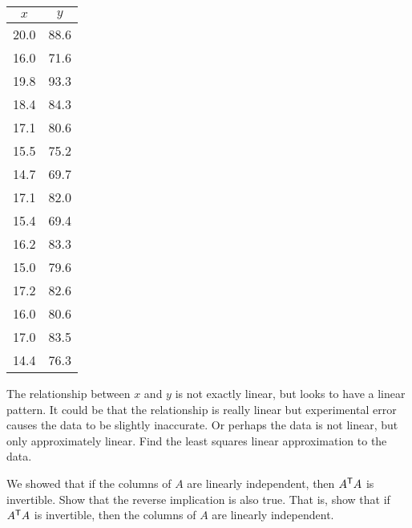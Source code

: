 \begin{center}
\begin{minipage}{2in}
\begin{center}
\begin{tabular}{|c|c|} \hline
$x$	&$y$ \\ \hline
20.0	&88.6 \\ \hline
16.0	&71.6 \\ \hline
19.8	&93.3 \\ \hline
18.4	&84.3 \\ \hline
17.1	&80.6 \\ \hline
15.5	&75.2 \\ \hline
14.7	&69.7 \\ \hline
17.1	&82.0 \\ \hline
15.4	&69.4 \\ \hline
16.2	&83.3 \\ \hline
15.0	&79.6 \\ \hline
17.2	&82.6 \\ \hline
16.0	&80.6 \\ \hline
17.0	&83.5 \\ \hline
14.4	&76.3 \\ \hline
\end{tabular}
\end{center} 
\end{minipage} \hspace{0.2in}
\begin{minipage}{2.5in}
 \begin{center}
    \end{center}
    \end{minipage}
    \end{center}
The relationship between $x$ and $y$ is not exactly linear, but looks to have a linear pattern. It could be that the relationship is really linear but experimental error causes the data to be slightly inaccurate. Or perhaps the data is not linear, but only approximately linear. Find the least squares linear approximation to the data. 

\item We showed that if the columns of $A$ are linearly independent, then $A^{\mathsf{T}}A$ is invertible. Show that the reverse implication is also true. That is, show that if $A^{\mathsf{T}}A$ is invertible, then the columns of $A$ are linearly independent.

	

